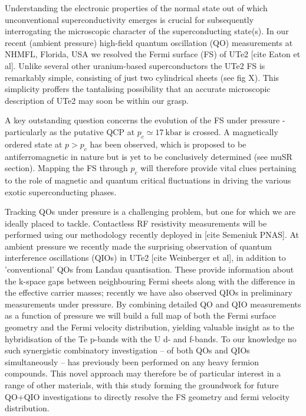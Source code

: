  

Understanding the electronic properties of the normal state out of which unconventional superconductivity emerges is crucial for subsequently interrogating the microscopic character of the superconducting state(s). In our recent (ambient pressure) high-field quantum oscillation (QO) measurements at NHMFL, Florida, USA we resolved the Fermi surface (FS) of UTe2 [cite Eaton et al]. Unlike several other uranium-based superconductors the UTe2 FS is remarkably simple, consisting of just two cylindrical sheets (see fig X). This simplicity proffers the tantalising possibility that an accurate microscopic description of UTe2 may soon be within our grasp. 

 

A key outstanding question concerns the evolution of the FS under pressure - particularly as the putative QCP at $p_c \simeq \SI{17}{\kilo\bar}$ is crossed. A magnetically ordered state at $p > p_c$ has been observed, which is proposed to be antiferromagnetic in nature but is yet to be conclusively determined (see muSR section).  Mapping the FS through $p_c$ will therefore provide vital clues pertaining to the role of magnetic and quantum critical fluctuations in driving the various exotic superconducting phases.

Tracking QOs under pressure is a challenging problem, but one for which we are ideally placed to tackle. Contactless RF resistivity measurements will be performed using our methodology recently deployed in [cite Semeniuk PNAS]. At ambient pressure we recently made the surprising observation of quantum interference oscillations (QIOs) in UTe2 [cite Weinberger et al], in addition to 'conventional' QOs from Landau quantisation. These provide information about the k-space gaps between neighbouring Fermi sheets along with the difference in the effective carrier masses; recently we have also observed QIOs in preliminary measurements under pressure. By combining detailed QO and QIO measurements as a function of pressure we will build a full map of both the Fermi surface geometry and the Fermi velocity distribution, yielding valuable insight as to the hybridisation of the Te p-bands with the U d- and f-bands. To our knowledge no such synergistic combinatory investigation – of both QOs and QIOs simultaneously – has previously been performed on any heavy fermion compounds. This novel approach may therefore be of particular interest in a range of other materials, with this study forming the groundwork for future QO+QIO investigations to directly resolve the FS geometry and fermi velocity distribution. 

